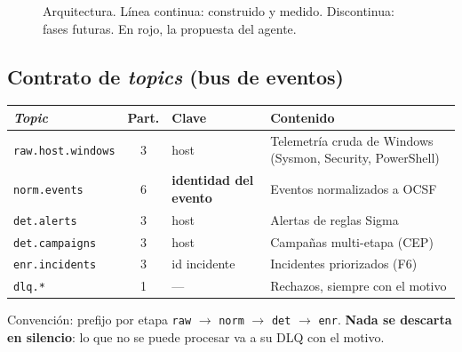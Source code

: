 \documentclass[11pt,a4paper]{article}
\newcommand{\cod}[1]{\texttt{#1}}
\newcommand{\flecha}{$\rightarrow$}
\begin{document}
\begin{figure}[h]
\caption{Arquitectura. Línea continua: construido y medido. Discontinua: fases futuras. En rojo, la propuesta del agente.}
\end{figure}

\subsection{Contrato de \textit{topics} (bus de eventos)}

\begin{center}
\small
\begin{tabularx}{\linewidth}{l c l X}
\toprule
\textit{Topic} & Part. & Clave & Contenido \\
\midrule
\cod{raw.host.windows} & 3 & host & Telemetría cruda de Windows (Sysmon, Security, PowerShell) \\
\cod{norm.events} & 6 & \textbf{identidad del evento} & Eventos normalizados a OCSF \\
\cod{det.alerts} & 3 & host & Alertas de reglas Sigma \\
\cod{det.campaigns} & 3 & host & Campañas multi-etapa (CEP) \\
\cod{enr.incidents} & 3 & id incidente & Incidentes priorizados (F6) \\
\cod{dlq.*} & 1 & --- & Rechazos, siempre con el motivo \\
\bottomrule
\end{tabularx}
\end{center}

Convención: prefijo por etapa \cod{raw} \flecha{} \cod{norm} \flecha{} \cod{det} \flecha{} \cod{enr}.
\textbf{Nada se descarta en silencio}: lo que no se puede procesar va a su DLQ con el motivo.
\end{document}
